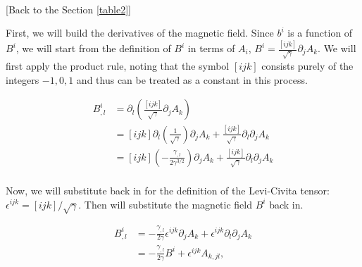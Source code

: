 \documentclass[landscape,letterpaper,10pt,english]{article}
\begin{document}
\begin{align}
\end{align}

     {[}Back to the Section \ref{table2}{]}

First, we will build the derivatives of the magnetic field. Since
\(b^i\) is a function of \(B^i\), we will start from the definition of
\(B^i\) in terms of \(A_i\),
\(B^i = \frac{[ijk]}{\sqrt{\gamma}} \partial_j A_k\). We will first
apply the product rule, noting that the symbol \([ijk]\) consists purely
of the integers \(-1, 0, 1\) and thus can be treated as a constant in
this process.

\begin{align}
B^i_{,l} &= \partial_l \left( \frac{[ijk]}{\sqrt{\gamma}} \partial_j A_k \right)  \\
         &= [ijk] \partial_l \left( \frac{1}{\sqrt{\gamma}}\right) \partial_j A_k + \frac{[ijk]}{\sqrt{\gamma}} \partial_l \partial_j A_k \\
         &= [ijk]\left(-\frac{\gamma_{,l}}{2\gamma^{3/2}}\right) \partial_j A_k + \frac{[ijk]}{\sqrt{\gamma}} \partial_l \partial_j A_k \\
\end{align}

Now, we will substitute back in for the definition of the Levi-Civita
tensor: \(\epsilon^{ijk} = [ijk] / \sqrt{\gamma}\). Then will substitute
the magnetic field \(B^i\) back in.

\begin{align}
B^i_{,l} &= -\frac{\gamma_{,l}}{2\gamma} \epsilon^{ijk} \partial_j A_k + \epsilon^{ijk} \partial_l \partial_j A_k \\
         &= -\frac{\gamma_{,l}}{2\gamma} B^i + \epsilon^{ijk} A_{k,jl}, \\
\end{align}
\end{document}

